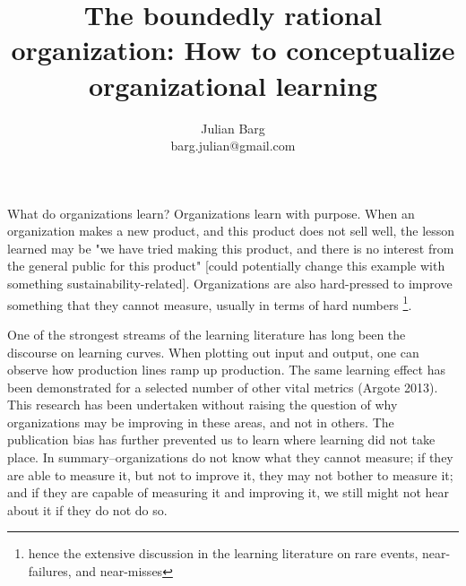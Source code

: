 \documentclass[12pt, man, natbib]{apa6}
\title{The boundedly rational organization: How to conceptualize organizational learning}
\author{Julian Barg\\barg.julian@gmail.com}
\affiliation{Ivey Business School}
\begin{document}
	
	\maketitle
	
	\singlespacing
	
	\section{}	
	
	What do organizations learn? Organizations learn with purpose. When an organization makes a new product, and this product does not sell well, the lesson learned may be "we have tried making this product, and there is no interest from the general public for this product" [could potentially change this example with something sustainability-related]. Organizations are also hard-pressed to improve something that they cannot measure, usually in terms of hard numbers \footnote{hence the extensive discussion in the learning literature on rare events, near-failures, and near-misses}.
	
	One of the strongest streams of the learning literature has long been the discourse on learning curves. When plotting out input and output, one can observe how production lines ramp up production. The same learning effect has been demonstrated for a selected number of other vital metrics (Argote 2013). This research has been undertaken without raising the question of why organizations may be improving in these areas, and not in others. The publication bias has further prevented us to learn where learning did not take place. In summary--organizations do not know what they cannot measure; if they are able to measure it, but not to improve it, they may not bother to measure it; and if they are capable of measuring it and improving it, we still might not hear about it if they do not do so.
	
\end{document}

